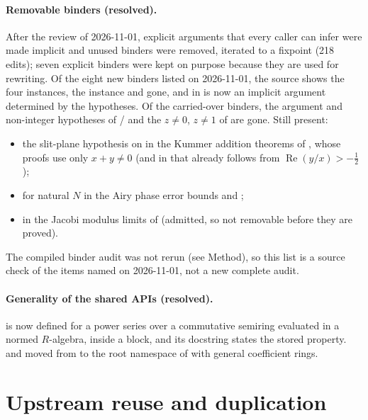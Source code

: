 \documentclass[11pt,a4paper]{article}
\begin{document}
\paragraph{Removable binders (resolved).}
After the review of 2026-11-01, explicit arguments that every caller can infer were made
implicit and unused binders were removed, iterated to a fixpoint (218 edits); seven explicit
binders were kept on purpose because they are used for rewriting. Of the eight new binders
listed on 2026-11-01, the source shows the four  instances, the
 instance and  gone, and  in  is now an
implicit argument determined by the hypotheses. Of the carried-over binders, the argument and
non-integer hypotheses of / and the
$z\ne0$, $z\ne1$ of  are gone. Still present:
\begin{itemize}
  \item the slit-plane hypothesis on  in the Kummer addition theorems of
    , whose proofs use only $x+y\ne0$ (and in
     that already follows from $\operatorname{Re}(y/x)>-\tfrac12$);
  \item {} for natural $N$ in the Airy phase error bounds 
    and ;
  \item {} in the Jacobi modulus limits of 
    (admitted, so not removable before they are proved).
\end{itemize}
The compiled binder audit was not rerun (see Method), so this list is a source check of the
items named on 2026-11-01, not a new complete audit.

\paragraph{Generality of the shared APIs (resolved).}
 is now defined for a power series over a commutative semiring
evaluated in a normed $R$-algebra, inside a  block, and its
docstring states the stored property.  and  moved
from  to the root namespace of
 with general coefficient rings.

\section{Upstream reuse and duplication}
\end{document}
